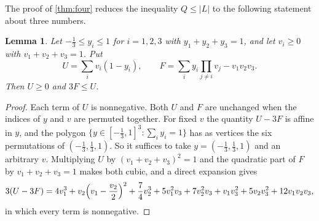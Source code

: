 \documentclass[11pt,a4paper]{article}
\numberwithin{equation}{section}
\newtheorem{lemma}[theorem]{Lemma}
\theoremstyle{remark}
\begin{document}
The proof of \cref{thm:four} reduces the inequality $Q\le|L|$ to the following statement about three numbers.

\begin{lemma}\label{lem:three}
Let $-\frac13\le y_i\le1$ for $i=1,2,3$ with $y_1+y_2+y_3=1$, and let $v_i\ge0$ with $v_1+v_2+v_3=1$. Put
\[
U=\sum_i v_i(1-y_i),\qquad F=\sum_i y_i\prod_{j\ne i}v_j-v_1v_2v_3 .
\]
Then $U\ge0$ and $3F\le U$.
\end{lemma}

\begin{proof}
Each term of $U$ is nonnegative. Both $U$ and $F$ are unchanged when the indices of $y$ and $v$ are permuted together. For fixed $v$ the quantity $U-3F$ is affine in $y$, and the polygon $\{y\in[-\frac13,1]^3:\sum_iy_i=1\}$ has as vertices the six permutations of $(-\frac13,\frac13,1)$. So it suffices to take $y=(-\frac13,\frac13,1)$ and an arbitrary $v$. Multiplying $U$ by $(v_1+v_2+v_3)^2=1$ and the quadratic part of $F$ by $v_1+v_2+v_3=1$ makes both cubic, and a direct expansion gives
\[
3(U-3F)=4v_1^3+v_2\Bigl(v_1-\frac{v_2}2\Bigr)^2+\frac74v_2^3+5v_1^2v_3+7v_2^2v_3+v_1v_3^2+5v_2v_3^2+12v_1v_2v_3,
\]
in which every term is nonnegative.
\end{proof}
\end{document}
